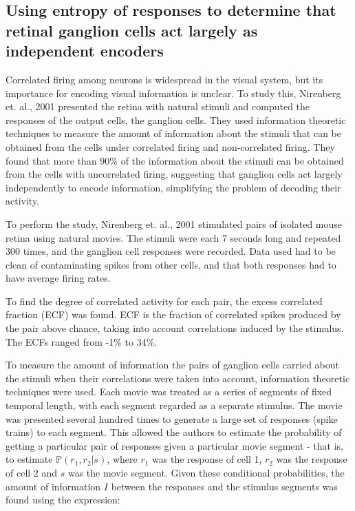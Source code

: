 \documentclass[twoside]{article}
\begin{document}
\begin{multicols}{2}
\section{Using entropy of responses to determine that retinal ganglion cells act largely as independent encoders}

Correlated firing among neurons is widespread in the visual system, but its importance for encoding visual information is unclear. To study this, Nirenberg et. al., 2001 presented the retina with natural stimuli and computed the responses of the output cells, the ganglion cells. They used information theoretic techniques to measure the amount of information about the stimuli that can be obtained from the cells under correlated firing and non-correlated firing. They found that more than 90\% of the information about the stimuli can be obtained from the cells with uncorrelated firing, suggesting that ganglion cells act largely independently to encode information, simplifying the problem of decoding their activity. 

To perform the study, Nirenberg et. al., 2001 stimulated pairs of isolated mouse retina using natural movies. The stimuli were each 7 seconds long and repeated 300 times, and the ganglion cell responses were recorded. Data used had to be clean of contaminating spikes from other cells, and that both responses had to have average firing rates. 

To find the degree of correlated activity for each pair, the excess correlated fraction (ECF) was found. ECF is the fraction of correlated spikes produced by the pair above chance, taking into account correlations induced by the stimulus. The ECFs ranged from -1\% to 34\%. 

To measure the amount of information the pairs of ganglion cells carried about the stimuli when their correlations were taken into account, information theoretic techniques were used. Each movie was treated as a series of segments of fixed temporal length, with each segment regarded as a separate stimulus. The movie was presented several hundred times to generate a large set of responses (spike trains) to each segment. This allowed the authors to estimate the probability of getting a particular pair of responses given a particular movie segment - that is, to estimate $\mathbb{P}(r_1,r_2|s)$, where $r_1$ was the response of cell 1, $r_2$ was the response of cell 2 and $s$ was the movie segment. Given these conditional probabilities, the amount of information $I$ between the responses and the stimulus segments was found using the expression:



\end{multicols}
\end{document}
